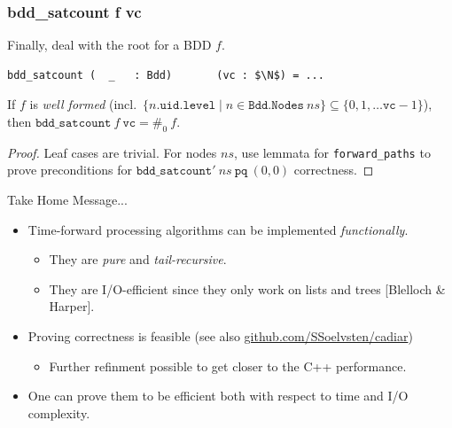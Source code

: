 \documentclass[english, aspectratio=169]{beamer}
\newcommand{\ns}[0]{\ensuremath{\mathit{ns}}}
\newcommand{\pq}[0]{\ensuremath{\texttt{pq}}}
\newcommand{\vc}[0]{\ensuremath{\texttt{vc}}}
\begin{document}
\begin{frame} %
  \frametitle{bdd\_satcount f vc}

  Finally, deal with the root for a BDD $f$.

  \begin{lstlisting}
bdd_satcount (  _   : Bdd)       (vc : $\N$) = ...
  \end{lstlisting}

  \begin{theorem}
    If $f$ is \emph{well formed} (incl.\
    $\{ n.\texttt{uid}.\texttt{level} \mid n \in \texttt{Bdd.Nodes}\ \ns \} \subseteq \{ 0, 1,
    \dots \vc-1 \}$),\\then $\texttt{bdd\_satcount}\ f\ \vc = \#_0\ f$.
  \end{theorem}
  \begin{proof}
    Leaf cases are trivial. For nodes \ns, use lemmata for \texttt{forward\_paths} to prove
    preconditions for $\texttt{bdd\_satcount}'\ \ns\ \pq\ (0,0)$ correctness.
  \end{proof}
\end{frame}

\blankframe

\begin{frame}
  \begin{center}
    \LARGE\bf

    Take Home Message...
  \end{center}

  \begin{itemize}
  \item Time-forward processing algorithms can be implemented \emph{functionally}.
    \begin{itemize}
    \item They are \emph{pure} and \emph{tail-recursive}.
    \item They are I/O-efficient since they only work on lists and trees [Blelloch \& Harper].
    \end{itemize}

    \bigskip

  \item Proving correctness is feasible (see also
    \href{https://github.com/SSoelvsten/cadiar}{github.com/SSoelvsten/cadiar})
    \begin{itemize}
    \item Further refinment possible to get closer to the C++ performance.
    \end{itemize}

    \bigskip

  \item One can prove them to be efficient both with respect to time and I/O complexity.
  \end{itemize}
\end{frame}
\end{document}
